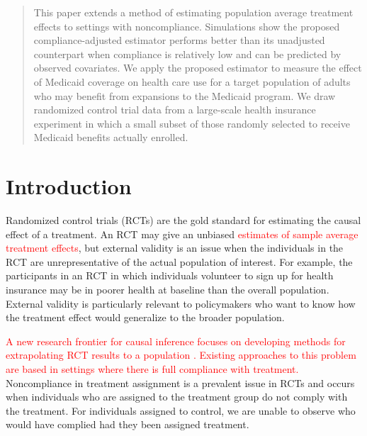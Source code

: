\documentclass[hidelinks,12pt]{article}
\begin{document}
\begin{singlespace} %
\maketitle  
\end{singlespace}

\thispagestyle{empty}
\begin{abstract}  
\noindent 
This paper extends a method of estimating population average treatment effects to settings with noncompliance. Simulations show the proposed compliance-adjusted estimator performs better than its unadjusted counterpart when compliance is relatively low and can be predicted by observed covariates. We apply the proposed estimator to measure the effect of Medicaid coverage on health care use for a target population of adults who may benefit from expansions to the Medicaid program. We draw randomized control trial data from a large-scale health insurance experiment in which a small subset of those randomly selected to receive Medicaid benefits actually enrolled.
\end{abstract}	

\pagebreak
\setcounter{page}{1} %

\vspace{20mm}

\section{Introduction}\label{intro}
Randomized control trials (RCTs) are the gold standard for estimating the causal effect of a treatment. An RCT may give an unbiased \textcolor{red}{estimates of sample average treatment effects}, but external validity is an issue when the individuals in the RCT are unrepresentative of the actual population of interest. For example, the participants in an RCT in which individuals volunteer to sign up for health insurance may be in poorer health at baseline than the overall population. External validity is particularly relevant to policymakers who want to know how the treatment effect would generalize to the broader population. 

\textcolor{red}{A new research frontier for causal inference focuses on developing methods for extrapolating RCT results to a population \citep[e.g.,][]{ImaKinStu08}. Existing approaches to this problem are based in settings where there is full compliance with treatment.} Noncompliance in treatment assignment is a prevalent issue in RCTs and occurs when individuals who are assigned to the treatment group do not comply with the treatment. For individuals assigned to control, we are unable to observe who would have complied had they been assigned treatment.
\end{document}
